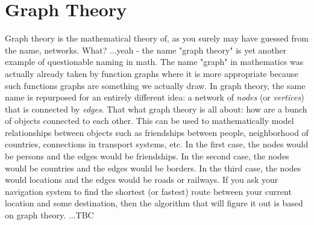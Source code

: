 \chapter{Graph Theory}
Graph theory is the mathematical theory of, as you surely may have guessed from the name, networks. What? ...yeah - the name "graph theory" is yet another example of questionable naming in math. The name "graph" in mathematics was actually already taken by function graphs where it is more appropriate because such functions graphs are something we actually draw. In graph theory, the same name is repurposed for an entirely different idea: a network of \emph{nodes} (or \emph{vertices}) that is connected by \emph{edges}. That what graph theory is all about: how are a bunch of objects connected to each other. This can be used to mathematically model relationships between objects such as friendships between people, neighborhood of countries, connections in transport systems, etc. In the first case, the nodes would be persons and the edges would be friendships. In the second case, the nodes would be countries and the edges would be borders. In the third case, the nodes would locations and the edges would be roads or railways. If you ask your navigation system to find the shortest (or fastest) route between your current location and some destination, then the algorithm that will figure it out is based on graph theory. ...TBC







